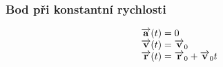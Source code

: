 \documentclass[letterpaper,10pt,english]{jupyterBook}
\begin{document}
\subsubsection{Bod při konstantní rychlosti}
\label{\detokenize{Prednasky/1_2_Kinematika_v_1D:bod-pri-konstantni-rychlosti}}\begin{equation*}
\begin{split}
\begin{array}{l l}
\overrightarrow{\mathbf{a}}(t) = 0 \\
\overrightarrow{\mathbf{v}}(t) = \overrightarrow{\mathbf{v}}_0 \\
\overrightarrow{\mathbf{r}}(t) = \overrightarrow{\mathbf{r}}_0 + \overrightarrow{\mathbf{v}}_0t
\end{array}
\end{split}
\end{equation*}
\end{document}
